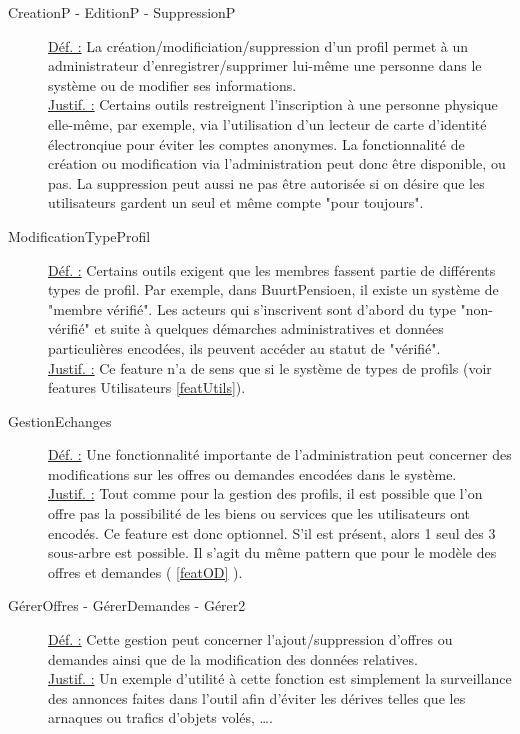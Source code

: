 \begin{description}
\item [CreationP - EditionP - SuppressionP]
\underline{Déf. :}  La création/modificiation/suppression d'un profil permet à un administrateur d'enregistrer/supprimer lui-même une personne dans le système ou de modifier ses informations.
\\ \underline{Justif. :}  Certains outils restreignent l'inscription à une personne physique elle-même,  par exemple,  via l'utilisation d'un lecteur de carte d'identité électronqiue pour éviter les comptes anonymes.  La fonctionnalité de création ou modification via l'administration peut donc être disponible,  ou pas.  La suppression peut aussi ne pas être autorisée si on désire que les utilisateurs gardent un seul et même compte "pour toujours". 
\newline

\item [ModificationTypeProfil]
\label{featTypes}
\underline{Déf. :}  Certains outils exigent que les membres fassent partie de différents types de profil.  Par exemple,  dans BuurtPensioen,  il existe un système de "membre vérifié".  Les acteurs qui s'inscrivent sont d'abord du type "non-vérifié" et suite à quelques démarches administratives et données particulières encodées,  ils peuvent accéder au statut de "vérifié".  
\\ \underline{Justif. :}  Ce feature n'a de sens que si le système de types de profils (voir features Utilisateurs \ref{featUtils}).
\newline

\item [GestionEchanges]
\underline{Déf. :}  Une fonctionnalité importante de l'administration peut concerner des modifications sur les offres ou demandes encodées dans le système.
\\ \underline{Justif. :}  Tout comme pour la gestion des profils,  il est possible que l'on offre pas la possibilité de les biens ou services que les utilisateurs ont encodés.  Ce feature est donc optionnel.  S'il est présent,  alors 1 seul des 3 sous-arbre est possible.  Il s'agit du même pattern que pour le modèle des offres et demandes ( \ref{featOD} ).
\newline

\item [GérerOffres - GérerDemandes - Gérer2]
\underline{Déf. :}  Cette gestion peut concerner l'ajout/suppression d'offres ou demandes ainsi que de la modification des données relatives.  
\\ \underline{Justif. :}  Un exemple d'utilité à cette fonction est simplement la surveillance des annonces faites dans l'outil afin d'éviter les dérives telles que les arnaques ou trafics d'objets volés,  \dots .   
\newline


\end{description}
